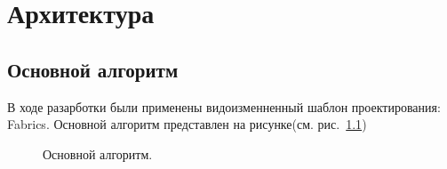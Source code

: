 
\chapter{Архитектура}

\section{Основной алгоритм}
В ходе разарботки были применены видоизменненный шаблон проектирования: Fabrics. 
Основной алгоритм представлен на рисунке(см. рис.~\ref{ris:alg_main})

\begin{figure}[h]
\caption{Основной алгоритм.}
\label{ris:alg_main}
\end{figure}
